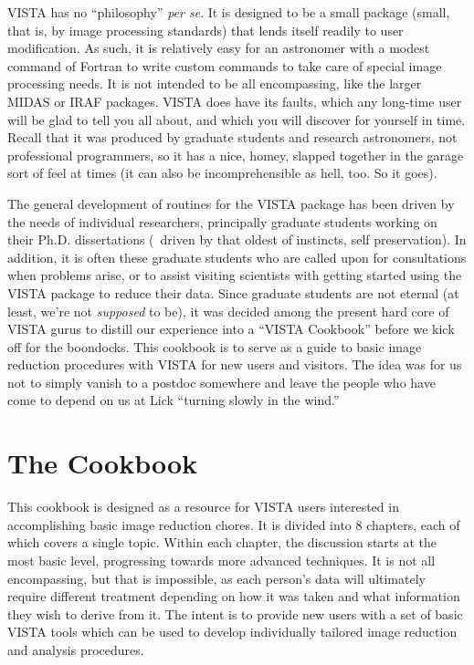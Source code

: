 VISTA has no ``philosophy'' {\it per se}.  It is designed to be a small
package (small, that is, by image processing standards) that lends itself
readily to user modification.  As such, it is relatively easy for an
astronomer with a modest command of Fortran to write custom commands to take
care of special image processing needs.  It is not intended to be all
encompassing, like the larger MIDAS or IRAF packages. VISTA does have its
faults, which any long-time user will be glad to tell you all about, and which
you will discover for yourself in time.  Recall that it was produced by
graduate students and research astronomers, not professional programmers, so
it has a nice, homey, slapped together in the garage sort of feel at times (it
can also be incomprehensible as hell, too.  So it goes). 

The general development of routines for the VISTA package has been driven by
the needs of individual researchers, principally graduate students working on
their Ph.D. dissertations (\ie\ driven by that oldest of instincts, self
preservation).  In addition, it is often these graduate students who are
called upon for consultations when problems arise, or to assist visiting
scientists with getting started using the VISTA package to reduce their data.
Since graduate students are not eternal (at least, we're not {\it supposed} to
be), it was decided among the present hard core of VISTA gurus to distill our
experience into a ``VISTA Cookbook'' before we kick off for the boondocks. 
This cookbook is to serve as a guide to basic image reduction procedures with
VISTA for new users and visitors.  The idea was for us not to simply vanish to
a postdoc somewhere and leave the people who have come to depend on us at Lick
``turning slowly in the wind.'' 


\section{The Cookbook}

This cookbook is designed as a resource for VISTA users interested in
accomplishing basic image reduction chores.  It is divided into 8 chapters,
each of which covers a single topic.  Within each chapter, the discussion
starts at the most basic level, progressing towards more advanced techniques.
It is not all encompassing, but that is impossible, as each person's data will
ultimately require different treatment depending on how it was taken and what
information they wish to derive from it.  The intent is to provide new users
with a set of basic VISTA tools which can be used to develop individually
tailored  image reduction and analysis procedures. 


